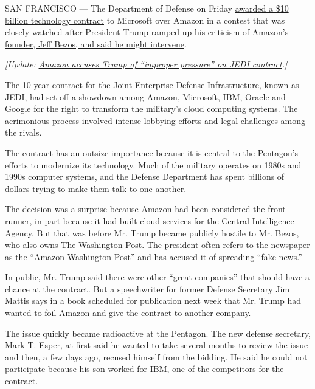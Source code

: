 SAN FRANCISCO --- The Department of Defense on Friday
\href{https://www.defense.gov/Newsroom/Contracts/Contract/Article/1999639/}{awarded
a \$10 billion technology contract} to Microsoft over Amazon in a
contest that was closely watched after
\href{https://www.nytimes3xbfgragh.onion/2019/07/18/us/politics/trump-amazon-defense-department-contract.html}{President
Trump ramped up his criticism of Amazon's founder, Jeff Bezos, and said
he might intervene}.

\emph{{[}Update:}
\href{https://www.nytimes3xbfgragh.onion/2019/12/09/technology/amazon-pentagon-contract-trump.html}{\emph{Amazon
accuses Trump of ``improper pressure'' on JEDI contract}}\emph{.{]}}

The 10-year contract for the Joint Enterprise Defense Infrastructure,
known as JEDI, had set off a showdown among Amazon, Microsoft, IBM,
Oracle and Google for the right to transform the military's cloud
computing systems. The acrimonious process involved intense lobbying
efforts and legal challenges among the rivals.

The contract has an outsize importance because it is central to the
Pentagon's efforts to modernize its technology. Much of the military
operates on 1980s and 1990s computer systems, and the Defense Department
has spent billions of dollars trying to make them talk to one another.

The decision was a surprise because
\href{https://www.nytimes3xbfgragh.onion/2019/08/02/us/politics/amazon-pentagon-contract-trump.html}{Amazon
had been considered the front-runner}, in part because it had built
cloud services for the Central Intelligence Agency. But that was before
Mr. Trump became publicly hostile to Mr. Bezos, who also owns The
Washington Post. The president often refers to the newspaper as the
``Amazon Washington Post'' and has accused it of spreading ``fake
news.''

In public, Mr. Trump said there were other ``great companies'' that
should have a chance at the contract. But a speechwriter for former
Defense Secretary Jim Mattis says
\href{https://www.washingtonpost.com/national-security/2019/10/23/syria-disagreement-with-trump-used-pretext-mattiss-departure-pentagon-chief-new-book-says/}{in
a book} scheduled for publication next week that Mr. Trump had wanted to
foil Amazon and give the contract to another company.

The issue quickly became radioactive at the Pentagon. The new defense
secretary, Mark T. Esper, at first said he wanted to
\href{https://www.nytimes3xbfgragh.onion/2019/08/01/us/politics/amazon-pentagon-contract.html}{take
several months to review the issue} and then, a few days ago, recused
himself from the bidding. He said he could not participate because his
son worked for IBM, one of the competitors for the contract.


